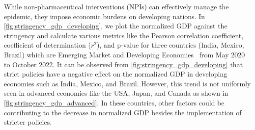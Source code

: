 \documentclass[tikz,fleqn,12pt]{wlscirep}
\begin{document}
While non-pharmaceutical interventions (NPIs) can effectively manage the epidemic, they impose economic burdens on developing nations. In \cref{fig:stringency_gdp_developing}, we plot the normalized GDP against the stringency and calculate various metrics like the Pearson correlation coefficient, coefficient of determination ($r^2$), and p-value for three countries (India, Mexico, Brazil) which are Emerging Market and Developing Economies~\cite{IMFCovid} from May 2020 to October 2022. It can be observed from \cref{fig:stringency_gdp_developing} that strict policies have a negative effect on the normalized GDP in developing economies such as India, Mexico, and Brazil. However, this trend is not uniformly seen in advanced economies like the USA, Japan, and Canada as shown in \cref{fig:stringency_gdp_advanced}. In these countries, other factors could be contributing to the decrease in normalized GDP besides the implementation of stricter policies.
\end{document}
